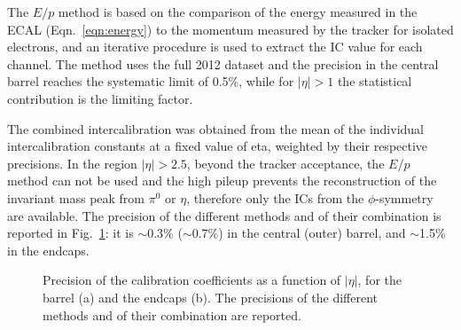 \documentclass[journal]{IEEEtran}
\begin{document}
The $E/p$ method is based on the comparison of the energy measured in the ECAL (Eqn.~\ref{eqn:energy}) to the momentum measured by the tracker for isolated electrons, and an iterative procedure is used to extract the IC value for each channel. The method uses the full 2012 dataset and the precision in the central barrel reaches the systematic limit of 0.5\%, while for $\vert\eta\vert>1$ the statistical contribution is the limiting factor.

The combined intercalibration was obtained from the mean of the individual intercalibration constants at a fixed value of eta, weighted by their respective precisions. In the region $\vert\eta\vert>2.5$, beyond the tracker acceptance, the $E/p$ method can not be used and the high pileup prevents the reconstruction of the invariant mass peak from $\pi^0$ or $\eta$, therefore only the ICs from the $\phi$-symmetry are available. The precision of the different methods and of their combination is reported in Fig.~\ref{fig:intercalib}: it is $\sim$0.3\% ($\sim$0.7\%) in the central (outer) barrel, and $\sim$1.5\% in the endcaps.
%
\begin{figure}[!t]
  \begin{center}
    \caption{Precision of the calibration coefficients as a function of $\vert\eta\vert$, for the barrel (a) and the endcaps (b). The precisions of the different methods and of their combination are reported. \label{fig:intercalib}}
  \end{center}
\end{figure}
%
\end{document}
